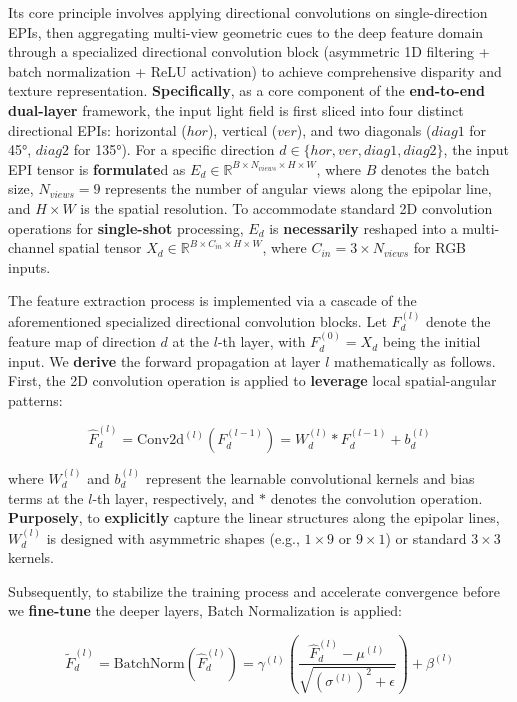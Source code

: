 Its core principle involves applying directional convolutions on single-direction EPIs, then aggregating multi-view geometric cues to the deep feature domain through a specialized directional convolution block (asymmetric 1D filtering + batch normalization + ReLU activation) to achieve comprehensive disparity and texture representation. \textbf{Specifically}, as a core component of the \textbf{end-to-end} \textbf{dual-layer} framework, the input light field is first sliced into four distinct directional EPIs: horizontal ($hor$), vertical ($ver$), and two diagonals ($diag1$ for 45°, $diag2$ for 135°). For a specific direction $d \in \{hor, ver, diag1, diag2\}$, the input EPI tensor is \textbf{formulate}d as $E_d \in \mathbb{R}^{B \times N_{views} \times H \times W}$, where $B$ denotes the batch size, $N_{views}=9$ represents the number of angular views along the epipolar line, and $H \times W$ is the spatial resolution. To accommodate standard 2D convolution operations for \textbf{single-shot} processing, $E_d$ is \textbf{necessarily} reshaped into a multi-channel spatial tensor $X_d \in \mathbb{R}^{B \times C_{in} \times H \times W}$, where $C_{in} = 3 \times N_{views}$ for RGB inputs.

The feature extraction process is implemented via a cascade of the aforementioned specialized directional convolution blocks. Let $F_d^{(l)}$ denote the feature map of direction $d$ at the $l$-th layer, with $F_d^{(0)} = X_d$ being the initial input. We \textbf{derive} the forward propagation at layer $l$ mathematically as follows. First, the 2D convolution operation is applied to \textbf{leverage} local spatial-angular patterns:

\[
\hat{F}_d^{(l)} = \text{Conv2d}^{(l)}(F_d^{(l-1)}) = W_d^{(l)} * F_d^{(l-1)} + b_d^{(l)} \label{eq:conv}
\]

where $W_d^{(l)}$ and $b_d^{(l)}$ represent the learnable convolutional kernels and bias terms at the $l$-th layer, respectively, and $*$ denotes the convolution operation. \textbf{Purposely}, to \textbf{explicitly} capture the linear structures along the epipolar lines, $W_d^{(l)}$ is designed with asymmetric shapes (e.g., $1 \times 9$ or $9 \times 1$) or standard $3 \times 3$ kernels. 

Subsequently, to stabilize the training process and accelerate convergence before we \textbf{fine-tune} the deeper layers, Batch Normalization is applied:

\[
\tilde{F}_d^{(l)} = \text{BatchNorm}(\hat{F}_d^{(l)}) = \gamma^{(l)} \left( \frac{\hat{F}_d^{(l)} - \mu^{(l)}}{\sqrt{(\sigma^{(l)})^2 + \epsilon}} \right) + \beta^{(l)} \label{eq:bn}
\]

